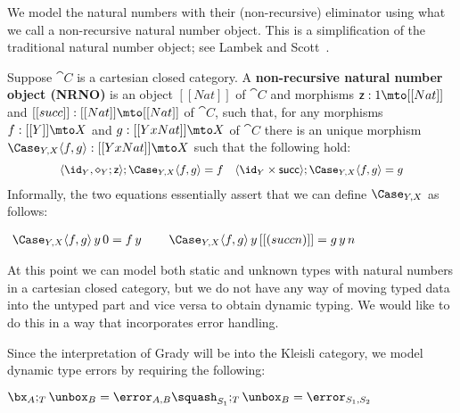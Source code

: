 We model the natural numbers with their (non-recursive) eliminator
using what we call a non-recursive natural number object.  This is a
simplification of the traditional natural number object; see Lambek
and Scott~\cite{Lambek:1988}.
\begin{definition}
  \label{def:SNNO}
  Suppose $\cat{C}$ is a cartesian closed category.  A
  \textbf{non-recursive natural number object (NRNO)} is an object
  $[[Nat]]$ of $\cat{C}$ and morphisms $\mathsf{z} : 1 \mto [[Nat]]$
  and $[[succ]] : [[Nat]] \mto [[Nat]]$ of $\cat{C}$, such that, for
  any morphisms $f : [[Y]] \mto X$ and $g : [[Y x Nat]] \mto X$ of
  $\cat{C}$ there is an unique morphism $\Case_{Y,X} \langle f,g \rangle : [[Y x Nat]] \mto X$
  such that the following hold:
  \[\small
  \setlength{\arraycolsep}{0pt}
  \begin{array}{cccccc}    
    \langle \id_Y, \diamond_Y;\mathsf{z} \rangle;\Case_{Y,X} \langle f,g \rangle = f & \quad &
    \langle \id_Y \times \mathsf{succ} \rangle;\Case_{Y,X} \langle f,g \rangle = g\\
  \end{array}
  \]  
  \noindent
       Informally, the two equations essentially assert that we can
       define $\Case_{Y,X}$ as follows:
       \begin{center}
         \begin{math}
           \setlength{\arraycolsep}{3pt}
           \begin{array}{ccccccccccc}
             {\Case_{Y,X} \langle f,g \rangle\,y\,0 = f\,y}
             & \quad & 
             {\Case_{Y,X} \langle f,g \rangle\,y\,[[(succ n)]] =  g\,y\,n}
           \end{array}
         \end{math}
       \end{center}
\end{definition}

At this point we can model both static and unknown types with natural
numbers in a cartesian closed category, but we do not have any way of
moving typed data into the untyped part and vice versa to obtain
dynamic typing.  We would like to do this in a way that incorporates
error handling.


Since the interpretation of Grady will be into the Kleisli category,
we model dynamic type errors by requiring the following:
\begin{center}
  \begin{math}
    \bx_A ;_T \unbox_B = \error_{A,B}
    \squash_{S_1} ;_T \unbox_B = \error_{S_1, S_2}
  \end{math}
\end{center}


